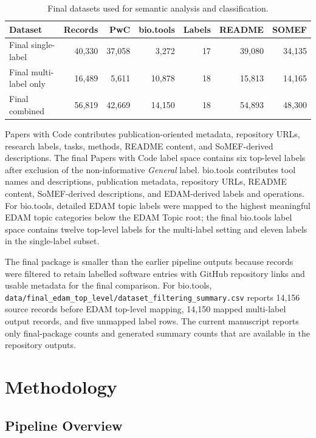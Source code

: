 \documentclass[pdflatex,sn-mathphys-num]{sn-jnl}%
\theoremstyle{thmstyleone}%
\theoremstyle{thmstyletwo}%
\theoremstyle{thmstylethree}%
\begin{document}
\begin{table}[htbp]
\centering
\small
\caption{Final datasets used for semantic analysis and classification.}
\label{tab:dataset-overview}
\begin{tabular}{lrrrrrr}
\toprule
Dataset & Records & PwC & bio.tools & Labels & README & SOMEF \\
\midrule
Final single-label & 40,330 & 37,058 & 3,272 & 17 & 39,080 & 34,135 \\
Final multi-label only & 16,489 & 5,611 & 10,878 & 18 & 15,813 & 14,165 \\
Final combined & 56,819 & 42,669 & 14,150 & 18 & 54,893 & 48,300 \\
\bottomrule
\end{tabular}
\end{table}

Papers with Code contributes publication-oriented metadata, repository URLs, research labels, tasks, methods, README content, and SoMEF-derived descriptions. The final Papers with Code label space contains six top-level labels after exclusion of the non-informative \emph{General} label. bio.tools contributes tool names and descriptions, publication metadata, repository URLs, README content, SoMEF-derived descriptions, and EDAM-derived labels and operations. For bio.tools, detailed EDAM topic labels were mapped to the highest meaningful EDAM topic categories below the EDAM Topic root; the final bio.tools label space contains twelve top-level labels for the multi-label setting and eleven labels in the single-label subset.

The final package is smaller than the earlier pipeline outputs because records were filtered to retain labelled software entries with GitHub repository links and usable metadata for the final comparison. For bio.tools, \texttt{data/final\_edam\_top\_level/dataset\_filtering\_summary.csv} reports 14,156 source records before EDAM top-level mapping, 14,150 mapped multi-label output records, and five unmapped label rows. The current manuscript reports only final-package counts and generated summary counts that are available in the repository outputs.

\section{Methodology}
\label{sec:methodology}

\subsection{Pipeline Overview}
\label{subsec:methodology-overview}
\end{document}
